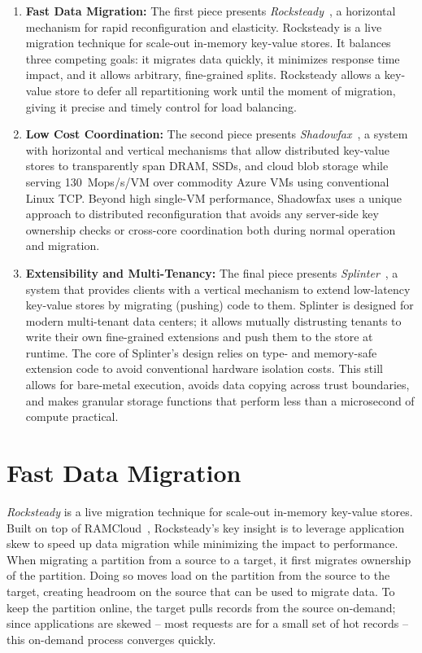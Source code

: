 \begin{enumerate}
\item \textbf{Fast Data Migration:}
The first piece presents \emph{Rocksteady}~\cite{rocksteady},
a horizontal mechanism for rapid reconfiguration and elasticity.
%
Rocksteady is a live migration technique for scale-out
in-memory key-value stores.
%
It balances three competing goals: it
migrates data quickly, it minimizes response time impact, and it
allows arbitrary, fine-grained splits.
%
Rocksteady allows a key-value store to defer all repartitioning work
until the moment of migration, giving it precise and timely control for
load balancing.

\item \textbf{Low Cost Coordination:}
The second piece presents \emph{Shadowfax}~\cite{shadowfax},
a system with horizontal and vertical mechanisms that
allow distributed key-value stores to
transparently span DRAM, SSDs, and cloud blob storage while serving
130~Mops/s/VM over commodity Azure VMs using conventional Linux TCP.
%
Beyond
high single-VM performance, Shadowfax uses a unique approach to distributed
reconfiguration that avoids any server-side key ownership checks
or cross-core coordination both during normal operation and migration.

\item \textbf{Extensibility and Multi-Tenancy:}
The final piece presents \emph{Splinter}~\cite{splinter}, a system that
provides clients with a vertical mechanism
to extend low-latency key-value stores by migrating (pushing) code to them.
%
Splinter is designed for
modern multi-tenant data centers; it allows mutually distrusting tenants to write
their own fine-grained extensions and push
them to the store at runtime.
%
The core of
Splinter's design relies on type- and memory-safe
extension code to avoid conventional hardware isolation costs.
%
This
still allows for bare-metal execution, avoids data copying across trust
boundaries, and makes granular storage functions that perform less than
a microsecond of compute practical.

\end{enumerate}

\section{Fast Data Migration}

\emph{Rocksteady} is a live migration technique for scale-out
in-memory key-value stores.
%
Built on top of RAMCloud~\cite{ramcloud}, Rocksteady’s key insight is to
leverage application skew to speed up data migration while minimizing
the impact to performance.
%
When migrating a partition from a source to a target, it first migrates
ownership of the partition.
%
Doing so moves load on the partition from the source to the target, creating
headroom on the source that can be used to migrate data.
%
To keep the partition online, the target pulls records from the source
on-demand; since applications are skewed – most requests are for a small
set of hot records – this on-demand process converges quickly.


